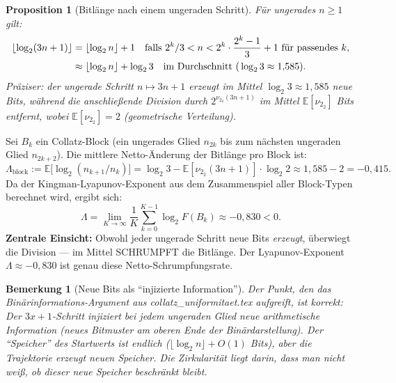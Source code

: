 \documentclass[12pt,a4paper]{article}
\newtheorem{proposition}[definition]{Proposition}
\newtheorem{bemerkung}[definition]{Bemerkung}
\newcommand{\vii}{\nu_2}
\begin{document}
\begin{proposition}[Bitlänge nach einem ungeraden Schritt]
\label{prop:bitlaenge}
Für ungerades $n \geq 1$ gilt:
\begin{align}
  \lfloor\log_2(3n+1)\rfloor
  &= \lfloor\log_2 n\rfloor + 1
    \quad\text{falls } 2^k/3 < n < 2^k \cdot \frac{2^k - 1}{3} + 1
    \text{ für passendes }k, \notag \\
  &\approx \lfloor\log_2 n\rfloor + \log_2 3
    \quad\text{im Durchschnitt (}\log_2 3 \approx 1{,}585\text{).} \notag
\end{align}
Präziser: der ungerade Schritt $n \mapsto 3n+1$ erzeugt im Mittel
$\log_2 3 \approx 1{,}585$ neue Bits, während die anschließende
Division durch $2^{\vii_2(3n+1)}$ im Mittel $\mathbb{E}[\vii_2]$ Bits
entfernt, wobei $\mathbb{E}[\vii_2] = 2$ (geometrische Verteilung).
\end{proposition}

\begin{tcolorbox}[dynfeld, title={Nettobilanz: Pro Block wächst die Bitlänge um $\Lambda_{\mathrm{block}}$}]
Sei $B_k$ ein Collatz-Block (ein ungerades Glied $n_{2k}$ bis zum nächsten
ungeraden Glied $n_{2k+2}$). Die mittlere Netto-Änderung der Bitlänge pro
Block ist:
\[
  \Lambda_{\mathrm{block}}
  := \mathbb{E}\bigl[\log_2(n_{k+1}/n_k)\bigr]
  = \log_2 3 - \mathbb{E}[\vii_2(3n+1)] \cdot \log_2 2
  \approx 1{,}585 - 2 = -0{,}415.
\]
Da der Kingman-Lyapunov-Exponent aus dem Zusammenspiel aller Block-Typen
berechnet wird, ergibt sich:
\[
  \Lambda = \lim_{K\to\infty} \frac{1}{K}\sum_{k=0}^{K-1} \log_2 F(B_k)
  \approx -0{,}830 < 0.
\]
\textbf{Zentrale Einsicht:} Obwohl jeder ungerade Schritt neue Bits
\emph{erzeugt}, überwiegt die Division --- im Mittel SCHRUMPFT die
Bitlänge. Der Lyapunov-Exponent $\Lambda \approx -0{,}830$ ist genau
diese Netto-Schrumpfungsrate.
\end{tcolorbox}

\begin{bemerkung}[Neue Bits als ``injizierte Information'']
Der Punkt, den das Binärinformations-Argument aus
\textit{collatz\_uniformitaet.tex} aufgreift, ist korrekt:
Der $3x+1$-Schritt injiziert bei jedem ungeraden Glied neue arithmetische
Information (neues Bitmuster am oberen Ende der Binärdarstellung). Der
``Speicher'' des Startwerts ist endlich ($\lfloor\log_2 n\rfloor + O(1)$
Bits), aber die Trajektorie \emph{erzeugt} neuen Speicher. Die Zirkularität
liegt darin, dass man nicht weiß, ob dieser neue Speicher beschränkt bleibt.
\end{bemerkung}
\end{document}
